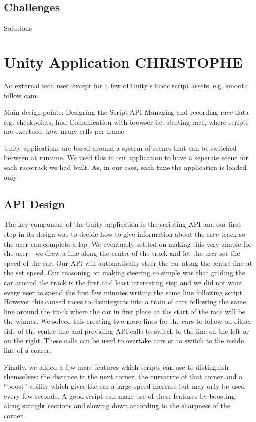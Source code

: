 \subsection{Challenges}
Solutions

\section{Unity Application {\color{blue} CHRISTOPHE}}
No external tech used except for a few of Unity's basic script assets, e.g. smooth follow cam.

Main design points:
Designing the Script API
Managing and recording race data e.g. checkpoints, hud
Comunication with browser i.e. starting race, where scripts are exectued, how many calls per frame

Unity applications are based around a system of scenes that can be switched between at runtime. We used this in our application to have a seperate scene for each racetrack we had built. As, in our case, each time the application is loaded only

\subsection{API Design}
The key component of the Unity application is the scripting API and our first step in its design was to decide how to give information about the race track so the user can complete a lap. We eventually settled on making this very simple for the user - we drew a line along the centre of the track and let the user set the speed of the car. Our API will automatically steer the car along the centre line at the set speed. Our reasoning on making steering so simple was that guiding the car around the track is the first and least interesting step and we did not want every user to spend the first few minutes writing the same line following script. However this caused races to disintegrate into a train of cars following the same line around the track where the car in first place at the start of the race will be the winner. We solved this creating two more lines for the cars to follow on either side of the centre line and providing API calls to switch to the line on the left or on the right. These calls can be used to overtake cars or to switch to the inside line of a corner.

Finally, we added a few more features which scripts can use to distinguish themselves: the distance to the next corner, the curvature of that corner and a ``boost'' ability which gives the car a large speed increase but may only be used every few seconds. A good script can make use of these features by boosting along straight sections and slowing down according to the sharpness of the corner.

